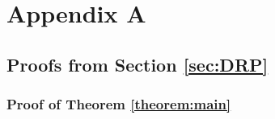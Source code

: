 \section{Appendix A}
\label{sec:appendix:a}

\subsection{Proofs from Section \ref{sec:DRP}}

\newcommand{\usestwod}{\todo{Uses 2D requirement:}}
\renewcommand{\usestwod}{}


\subsubsection{Proof of Theorem \ref{theorem:main}}

